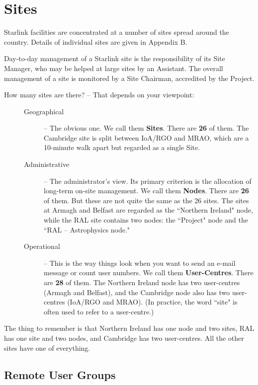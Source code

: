 \documentclass[twoside,11pt]{article}
\newcommand{\htmladdnormallink}[2]{#1}
\newenvironment{latexonly}{}{}
\begin{document}
\section*{Sites}

Starlink facilities are concentrated at a number of
\htmladdnormallink{sites}{http://star-www.rl.ac.uk/sites.html}
spread around the country.
\begin{latexonly}
Details of individual sites are given in Appendix B.
\end{latexonly}

Day-to-day management of a Starlink site is the responsibility of its
Site Manager, who may be helped at large sites by an Assistant.
The overall management of a site is monitored by a Site Chairman, accredited by
the Project.

How many sites are there? -- That depends on your viewpoint:
\begin{description}
\item[\mbox{}]\mbox{}
\begin{description}
\item [Geographical] --
 The obvious one.
 We call them {\bf Sites}.
 There are {\bf 26} of them.
 The Cambridge site is split between IoA/RGO and MRAO, which are a 10-minute
 walk apart but regarded as a single Site.
\item [Administrative] --
 The administrator's view.
 Its primary criterion is the allocation of long-term  on-site management.
 We call them {\bf Nodes}.
 There are {\bf 26} of them.
 But these are not quite the same as the 26 sites.
 The sites at Armagh and Belfast are regarded as the ``Northern Ireland" node,
 while the RAL site contains two nodes: the ``Project" node and the
 ``RAL -- Astrophysics node."
\item [Operational] --
 This is the way things look when you want to send an e-mail message or
 count user numbers.
 We call them {\bf User-Centres}.
 There are {\bf 28} of them.
 The Northern Ireland node has two user-centres (Armagh and Belfast), and
 the Cambridge node also has two user-centres (IoA/RGO and MRAO).
 (In practice, the word ``site" is often used to refer to a user-centre.)
\end{description}
\end{description}
The thing to remember is that Northern Ireland has one node and two sites,
RAL has one site and two nodes, and Cambridge has two user-centres.
All the other sites have one of everything.

\subsection*{Remote User Groups}
\end{document}
